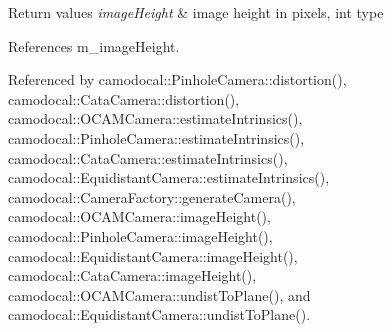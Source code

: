 \begin{DoxyRetVals}{Return values}
{\em image\+Height} & image height in pixels, int type \\
\hline
\end{DoxyRetVals}


References m\+\_\+image\+Height.



Referenced by camodocal\+::\+Pinhole\+Camera\+::distortion(), camodocal\+::\+Cata\+Camera\+::distortion(), camodocal\+::\+O\+C\+A\+M\+Camera\+::estimate\+Intrinsics(), camodocal\+::\+Pinhole\+Camera\+::estimate\+Intrinsics(), camodocal\+::\+Cata\+Camera\+::estimate\+Intrinsics(), camodocal\+::\+Equidistant\+Camera\+::estimate\+Intrinsics(), camodocal\+::\+Camera\+Factory\+::generate\+Camera(), camodocal\+::\+O\+C\+A\+M\+Camera\+::image\+Height(), camodocal\+::\+Pinhole\+Camera\+::image\+Height(), camodocal\+::\+Equidistant\+Camera\+::image\+Height(), camodocal\+::\+Cata\+Camera\+::image\+Height(), camodocal\+::\+O\+C\+A\+M\+Camera\+::undist\+To\+Plane(), and camodocal\+::\+Equidistant\+Camera\+::undist\+To\+Plane().

